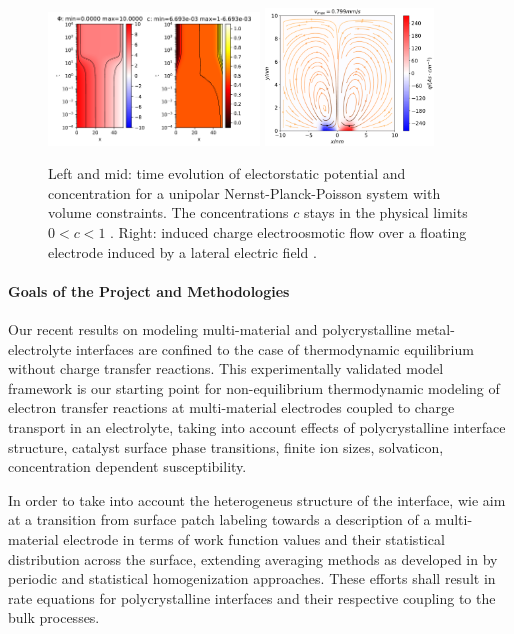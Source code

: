 \documentclass[a4paper,10pt]{article}
\begin{document}
\begin{figure}
  \centering
  \includegraphics[width=0.5\textwidth]{ccfg.pdf}
  \includegraphics[width=0.4\textwidth]{iceo.pdf}
   \caption{Left and mid: time evolution of electorstatic potential and concentration for
  a unipolar Nernst-Planck-Poisson system with volume constraints. The concentrations $c$
  stays in the physical limits $0<c<1$ \cite{CCFG2020}.
  Right: induced charge electroosmotic flow over a floating electrode induced by a lateral
  electric field \cite{FuhrmannEtAlECActa2019}. \label{fig:fv}}
\end{figure}


\paragraph{Goals of the Project and Methodologies}
Our recent results on modeling multi-material and polycrystalline metal-electrolyte interfaces are confined to the case of thermodynamic equilibrium without charge transfer reactions. This experimentally validated model framework is our starting point for non-equilibrium thermodynamic modeling of electron transfer reactions at multi-material electrodes coupled to charge transport in an electrolyte, taking into account  effects of polycrystalline interface structure, catalyst surface phase transitions, finite ion sizes, solvaticon, concentration dependent susceptibility.

In order to take into account  the heterogeneus structure of the interface, wie aim at a transition from surface patch labeling towards a description of a multi-material electrode in terms of  work function values  and their statistical distribution across the surface, extending  averaging methods as  developed in \cite{JES}  by periodic and statistical homogenization approaches.
%
These efforts shall result in  rate   equations  for polycrystalline interfaces  and their respective coupling to the bulk processes.
\end{document}
